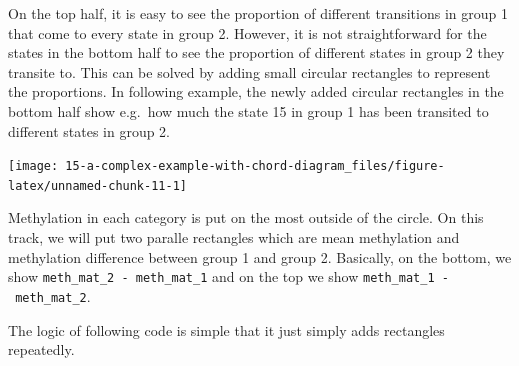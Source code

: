 \documentclass[]{book}
\newenvironment{Shaded}{\begin{snugshade}}{\end{snugshade}}
\newcommand{\KeywordTok}[1]{\textcolor[rgb]{0.13,0.29,0.53}{\textbf{#1}}}
\newcommand{\DataTypeTok}[1]{\textcolor[rgb]{0.13,0.29,0.53}{#1}}
\newcommand{\DecValTok}[1]{\textcolor[rgb]{0.00,0.00,0.81}{#1}}
\newcommand{\StringTok}[1]{\textcolor[rgb]{0.31,0.60,0.02}{#1}}
\newcommand{\ControlFlowTok}[1]{\textcolor[rgb]{0.13,0.29,0.53}{\textbf{#1}}}
\newcommand{\OperatorTok}[1]{\textcolor[rgb]{0.81,0.36,0.00}{\textbf{#1}}}
\newcommand{\NormalTok}[1]{#1}
\begin{document}
On the top half, it is easy to see the proportion of different
transitions in group 1 that come to every state in group 2. However, it
is not straightforward for the states in the bottom half to see the
proportion of different states in group 2 they transite to. This can be
solved by adding small circular rectangles to represent the proportions.
In following example, the newly added circular rectangles in the bottom
half show e.g.~how much the state 15 in group 1 has been transited to
different states in group 2.

\begin{Shaded}
\end{Shaded}

\begin{center}\texttt{[image: 15-a-complex-example-with-chord-diagram\_files/figure-latex/unnamed-chunk-11-1]} \end{center}

Methylation in each category is put on the most outside of the circle.
On this track, we will put two paralle rectangles which are mean
methylation and methylation difference between group 1 and group 2.
Basically, on the bottom, we show \texttt{meth\_mat\_2\ -\ meth\_mat\_1}
and on the top we show \texttt{meth\_mat\_1\ -\ meth\_mat\_2}.

The logic of following code is simple that it just simply adds
rectangles repeatedly.
\end{document}
